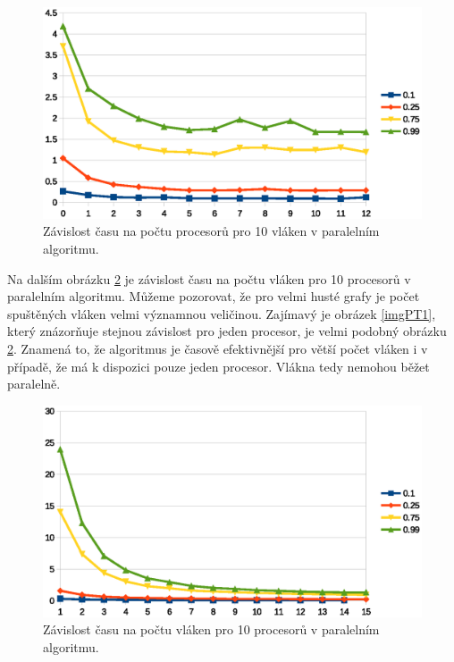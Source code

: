 \documentclass[a4paper, 11pt, titlepage, final]{article}[3. prosinec 2011]
\begin{document}
\begin{figure}[ht]
  \centering
  \includegraphics[scale=0.8]{img/paral_p_time.eps}
  \caption{Závislost času na počtu procesorů pro 10 vláken v paralelním algoritmu.}
  \label{imgPPT}
\end{figure}

Na dalším obrázku \ref{imgPTT} je závislost času na počtu vláken pro 10 procesorů v paralelním algoritmu. Můžeme pozorovat, že pro velmi husté grafy je počet spuštěných vláken velmi významnou veličinou. Zajímavý je obrázek \ref{imgPT1}, který znázorňuje stejnou závislost pro jeden procesor, je velmi podobný obrázku \ref{imgPTT}. Znamená to, že algoritmus je časově efektivnější pro větší počet vláken i v případě, že má k dispozici pouze jeden procesor. Vlákna tedy nemohou běžet paralelně.

\begin{figure}[ht]
  \centering
  \includegraphics[scale=0.8]{img/paral_t_time.eps}
  \caption{Závislost času na počtu vláken pro 10 procesorů v paralelním algoritmu.}
  \label{imgPTT}
\end{figure}
\end{document}
